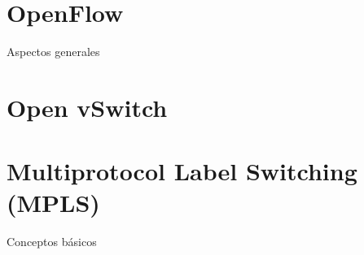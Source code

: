 \section{OpenFlow}
Aspectos generales


\section{Open vSwitch}












\section{Multiprotocol Label Switching (MPLS)}
Conceptos básicos

